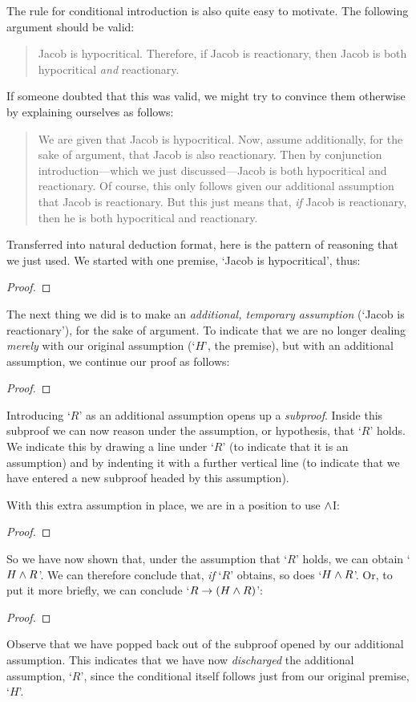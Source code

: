 The rule for conditional introduction is also quite easy to motivate. The following argument should be valid:
	\begin{quote}
		Jacob is hypocritical. Therefore, if Jacob is reactionary, then Jacob is both hypocritical \emph{and} reactionary.
	\end{quote}
If someone doubted that this was valid, we might try to convince them otherwise by explaining ourselves as follows:
	\begin{quote}
		We are given that Jacob is hypocritical. Now, assume additionally, for the sake of argument, that Jacob is also reactionary. Then by conjunction introduction---which we just discussed---Jacob is both hypocritical and reactionary. Of course, this only follows given our additional assumption that Jacob is reactionary. But this just means that, \emph{if} Jacob is reactionary, then he is both hypocritical and reactionary.
	\end{quote}
Transferred into natural deduction format, here is the pattern of reasoning that we just used. We started with one premise, `Jacob is hypocritical', thus:
	\begin{proof}
	\end{proof}
The next thing we did is to make an \emph{additional, temporary assumption} (`Jacob is reactionary'), for the sake of argument. To indicate that we are no longer dealing \emph{merely} with our original assumption (`$H$', the premise), but with an additional assumption, we continue our proof as follows:
	\begin{proof}
		\open
	\end{proof}
Introducing `$R$' as an additional assumption opens up a \emph{subproof}.  Inside this subproof we can now reason under the assumption, or hypothesis, that `$R$' holds. We indicate this by drawing a line under `$R$' (to indicate that it is an assumption) and by indenting it with a further vertical line (to indicate that we have entered a new subproof headed by this assumption). 

With this extra assumption in place, we are in a position to use $\wedge$I:
	\begin{proof}
		\open
	\end{proof}
So we have now shown that, under the assumption that `$R$' holds, we can obtain `$H \wedge R$'. We can therefore conclude that, \emph{if} `$R$' obtains, so does `$H \wedge R$'. Or, to put it more briefly, we can conclude `$R \rightarrow (H \wedge R)$':
	\begin{proof}
		\open
			\close
	\end{proof}
Observe that we have popped back out of the subproof opened by our additional assumption.  This indicates that we have now \emph{discharged} the additional assumption, `$R$', since the conditional itself follows just from our original premise, `$H$'.

